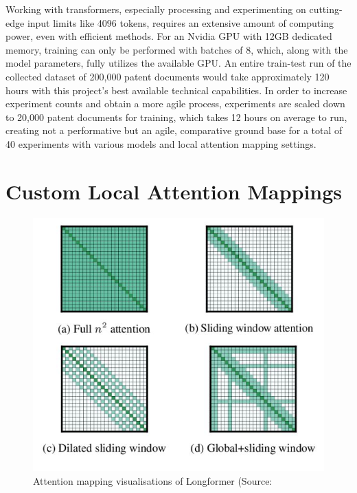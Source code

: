\documentclass{iyte}
\begin{document}
Working with transformers, especially processing and experimenting on cutting-edge input limits like 4096 tokens, requires an extensive amount of computing power, even with efficient methods. For an Nvidia GPU with 12GB dedicated memory, training can only be performed with batches of 8, which, along with the model parameters, fully utilizes the available GPU. An entire train-test run of the collected dataset of 200,000 patent documents would take approximately 120 hours with this project's best available technical capabilities. In order to increase experiment counts and obtain a more agile process, experiments are scaled down to 20,000 patent documents for training, which takes 12 hours on average to run, creating not a performative but an agile, comparative ground base for a total of 40 experiments with various models and local attention mapping settings.

\section{Custom Local Attention Mappings}

\begin{figure}[ht]
\centering
\includegraphics[width=12cm]{images/attention_comparison.jpg}
\caption{Attention mapping visualisations of Longformer (Source: \cite{longformer}}
\label{chart:map_comparison}
\end{figure}
\end{document}
